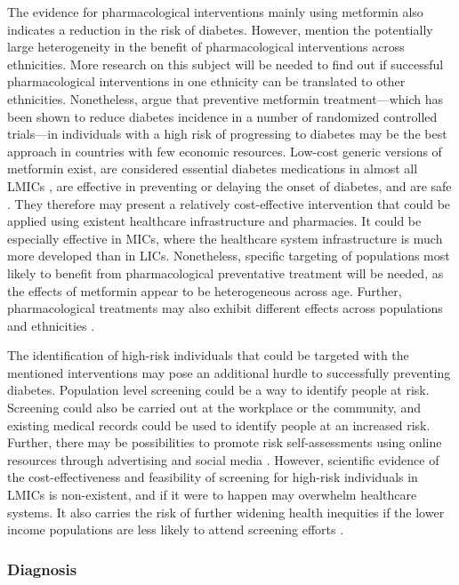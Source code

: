 The evidence for pharmacological interventions mainly using metformin also indicates a reduction in the risk of diabetes. However, \textcite{Cefalu2016} mention the potentially large heterogeneity in the benefit of pharmacological interventions across ethnicities. More research on this subject will be needed to find out if successful pharmacological interventions in one ethnicity can be translated to other ethnicities. Nonetheless, \textcite{Cefalu2016} argue that preventive metformin treatment---which has been shown to reduce diabetes incidence in a number of randomized controlled trials---in individuals with a high risk of progressing to diabetes may be the best approach in countries with few economic resources. Low-cost generic versions of metformin exist, are considered essential diabetes medications in almost all \acp{LMIC} \parencite{Bazargani2014}, are effective in preventing or delaying the onset of diabetes, and are safe \parencite{Gomes2013}. They therefore may present a relatively cost-effective intervention that could be applied using existent healthcare infrastructure and pharmacies. It could be especially effective in \acp{MIC}, where the healthcare system infrastructure is much more developed than in \acp{LIC}. Nonetheless, specific targeting of populations most likely to benefit from pharmacological preventative treatment will be needed, as the effects of metformin appear to be heterogeneous across age. Further, pharmacological treatments may also exhibit different effects across populations and ethnicities \parencite{Cefalu2016}. 

The identification of high-risk individuals that could be targeted with the mentioned interventions may pose an additional hurdle to successfully preventing diabetes. Population level screening could be a way to identify people at risk. Screening could also be carried out at the workplace or the community, and existing medical records could be used to identify people at an increased risk. Further, there may be possibilities to promote risk self-assessments using online resources through advertising and social media \parencite{Cefalu2016}. However, scientific evidence of the cost-effectiveness and feasibility of screening for high-risk individuals in \acp{LMIC} is non-existent, and if it were to happen may overwhelm healthcare systems. It also carries the risk of further widening health inequities if the lower income populations are less likely to attend screening efforts \parencite{Wareham2016}.


\subsubsection{Diagnosis}

